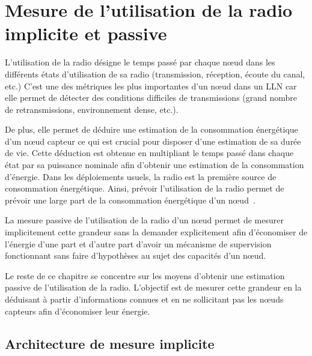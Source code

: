 \section{Mesure de l'utilisation de la radio implicite et passive}
\label{supervision:model}

L'utilisation de la radio désigne le temps passé par chaque nœud dans les différents états d'utilisation de sa radio (transmission, réception, écoute du canal, etc.)
C'est une des métriques les plus importantes d'un nœud dans un \ac{LLN} car elle permet de détecter des conditions difficiles de transmissions (grand nombre de retransmissions, environnement dense, etc.).

De plus, elle permet de déduire une estimation de la consommation énergétique d'un nœud capteur ce qui est crucial pour disposer d'une estimation de sa durée de vie.
Cette déduction est obtenue en multipliant le temps passé dans chaque état par sa puissance nominale afin d'obtenir une estimation de la consommation d'énergie.
Dans les déploiements usuels, la radio est la première source de consommation énergétique.
Ainsi, prévoir l'utilisation de la radio permet de prévoir une large part de la consommation énergétique d'un nœud~\cite{molina2010energy}.

La mesure passive de l'utilisation de la radio d'un nœud permet de mesurer implicitement cette grandeur sans la demander explicitement afin d'économiser de l'énergie d'une part et d'autre part d'avoir un mécanisme de supervision fonctionnant sans faire d'hypothèses au sujet des capacités d'un nœud.

Le reste de ce chapitre se concentre sur les moyens d'obtenir une estimation passive de l'utilisation de la radio.
L'objectif est de mesurer cette grandeur en la déduisant à partir d'informations connues et en ne sollicitant pas les nœuds capteurs afin d'économiser leur énergie.

\subsection{Architecture de mesure implicite}
\label{supervision:architecture}

